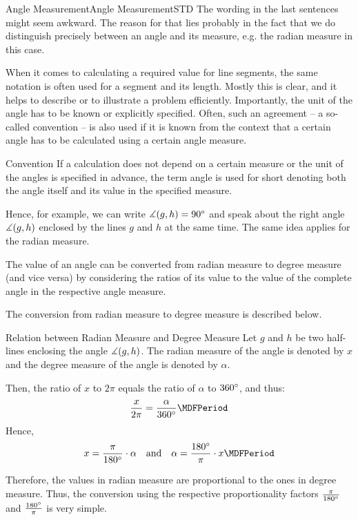 \begin{MXContent}{Angle Measurement}{Angle Measurement}{STD}
The wording in the last sentences might seem awkward. The reason for that lies probably in the fact
that we do distinguish precisely between an angle and its measure, e.g. the radian measure in this case.

When it comes to calculating a required value for line segments, the same notation is often
used for a segment and its length. Mostly this is clear, and it helps to describe or to illustrate 
a problem efficiently. Importantly, the unit of the angle has to be known or 
explicitly specified. Often, such an agreement -- a so-called convention -- is also used if it is 
known from the context that a certain angle has to be calculated using a certain angle measure. 

\begin{MXInfo}{Convention}%
If a calculation does not depend on a certain measure or the unit of the angles
is specified in advance, the term angle is used for short denoting both the angle itself and its value in 
the specified measure.


\end{MXInfo}
Hence, for example, we can write $\measuredangle(g,h) = 90^{\circ}$ and speak about the 
right angle $\measuredangle(g,h)$ enclosed by the lines $g$ and $h$ at the same time.
The same idea applies for the radian measure.

The value of an angle can be converted from radian measure to degree measure (and vice versa) by
considering the ratios of its value to the value of the complete angle in the 
respective angle measure. 

The conversion from radian measure to degree measure is described below.

\begin{MXInfo}{Relation between Radian Measure and Degree Measure}
Let $g$ and $h$ be two half-lines enclosing the angle $\measuredangle(g,h)$.
The radian measure of the angle is denoted by $x$ and the degree measure of 
the angle is denoted by $\alpha$.

Then, the ratio of $x$ to $2\pi$ equals the ratio of $\alpha$ to $360^{\circ}$, and thus:
\[
   \frac{x}{2\pi} = \frac{\alpha}{360\MGrad} \MDFPeriod
\]
Hence,
\[
x = \frac{\pi}{180\MGrad} \cdot \alpha %
\quad\text{and}\quad
\alpha = \frac{180\MGrad}{\pi} \cdot x \MDFPeriod
\]
\end{MXInfo}

Therefore, the values in radian measure are proportional to the ones in degree measure.
Thus, the conversion using the respective proportionality factors $\frac{\pi}{180^{\circ}}$ and 
$\frac{180^{\circ}}{\pi}$ is very simple.



\end{MXContent}
